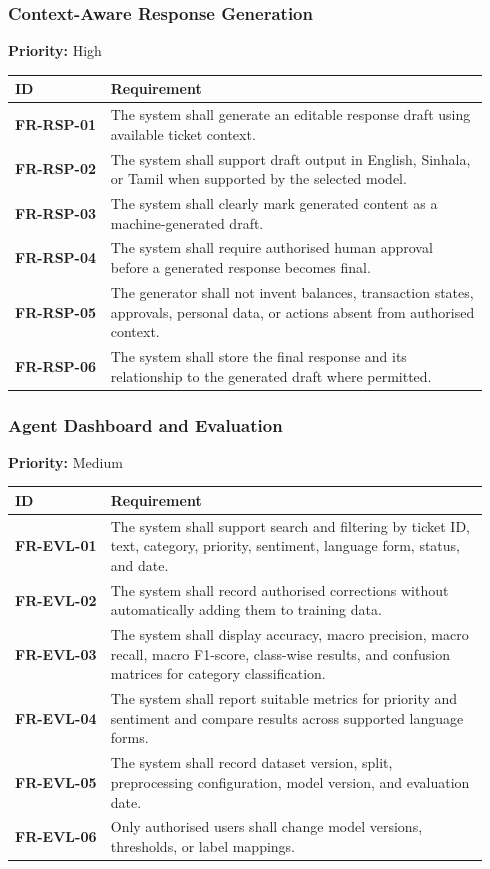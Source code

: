 \documentclass[10pt,letterpaper]{article}
\newcommand{\req}[1]{\textbf{#1}}
\newcommand{\priority}[1]{\textbf{Priority:} #1}
\newenvironment{requirements}{%
  \small\setlength{\tabcolsep}{4pt}%
  \begin{longtable}{|L{0.19\linewidth}|L{0.75\linewidth}|}
  \hline\textbf{ID} & \textbf{Requirement}\\\hline\endhead}{\hline\end{longtable}}
\newenvironment{templatebody}{\par\justifying\setlength{\emergencystretch}{3em}}{\par}
\begin{document}
\begin{templatebody}
\subsubsection{Context-Aware Response Generation}
\priority{High}
\begin{requirements}
\req{FR-RSP-01} & The system shall generate an editable response draft using available ticket context.\\
\req{FR-RSP-02} & The system shall support draft output in English, Sinhala, or Tamil when supported by the selected model.\\
\req{FR-RSP-03} & The system shall clearly mark generated content as a machine-generated draft.\\
\req{FR-RSP-04} & The system shall require authorised human approval before a generated response becomes final.\\
\req{FR-RSP-05} & The generator shall not invent balances, transaction states, approvals, personal data, or actions absent from authorised context.\\
\req{FR-RSP-06} & The system shall store the final response and its relationship to the generated draft where permitted.\\
\end{requirements}

\subsubsection{Agent Dashboard and Evaluation}
\priority{Medium}
\begin{requirements}
\req{FR-EVL-01} & The system shall support search and filtering by ticket ID, text, category, priority, sentiment, language form, status, and date.\\
\req{FR-EVL-02} & The system shall record authorised corrections without automatically adding them to training data.\\
\req{FR-EVL-03} & The system shall display accuracy, macro precision, macro recall, macro F1-score, class-wise results, and confusion matrices for category classification.\\
\req{FR-EVL-04} & The system shall report suitable metrics for priority and sentiment and compare results across supported language forms.\\
\req{FR-EVL-05} & The system shall record dataset version, split, preprocessing configuration, model version, and evaluation date.\\
\req{FR-EVL-06} & Only authorised users shall change model versions, thresholds, or label mappings.\\
\end{requirements}


\end{templatebody}
\end{document}
